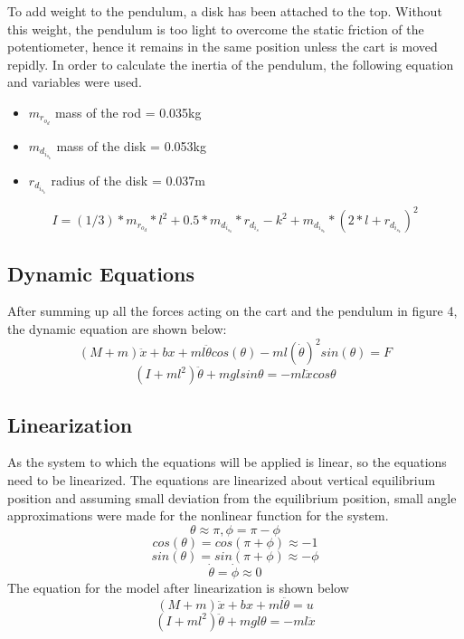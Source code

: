 \documentclass[12pt]{article}
\begin{document}
To add weight to the pendulum, a disk has been attached to the top. Without this weight, the pendulum is too light to overcome the static friction of the potentiometer, hence it remains in the same position unless the cart is moved repidly. In order to calculate the inertia of the pendulum, the following equation and variables were used.
\begin{itemize}
    \item $m_r_o_d$ mass of the rod = 0.035kg
    \item $m_d_i_s_k$ mass of the disk = 0.053kg 
    \item $r_d_i_s_k$ radius of the disk = 0.037m
\end{itemize}
\begin{equation}
   I = (1/3)*m_r_o_d*l^2 + 0.5*m_d_i_s_k*r_d_i_s-k^2 + m_d_i_s_k*(2*l + r_d_i_s_k)^2
\end{equation}


\subsection{Dynamic Equations}
After summing up all the forces acting on the cart and the pendulum in figure 4, the dynamic equation are shown below:
\begin{equation}
    (M+m)\ddot{x} + bx +ml\ddot{\theta}cos(\theta) - ml(\dot{\theta})^2sin(\theta) = F 
\end{equation}
\begin{equation}
    (I+ml^2)\ddot{\theta} + mglsin\theta = -ml\ddot{x}cos\theta
\end{equation}
\subsection{Linearization}
As the system to which the equations will be applied is linear, so the equations need to be linearized. The equations are linearized about vertical equilibrium position and assuming small deviation from the equilibrium position, small angle approximations were made for the nonlinear function for the system. 
\begin{equation}
    \theta{\approx}\pi, \phi = \pi - \phi
\end{equation}
\begin{equation}
    cos(\theta) = cos(\pi + \phi){\approx} -1
\end{equation}
\begin{equation}
    sin(\theta) = sin(\pi + \phi){\approx} -\phi
\end{equation}
\begin{equation}
    \dot{\theta} = \dot{\phi}{\approx} 0
\end{equation}
The equation for the model after linearization is shown below
\begin{equation}
    (M+m)\ddot{x} + bx +ml\ddot{\theta} = u
\end{equation}
\begin{equation}
    (I+ml^2)\ddot{\theta} + mgl\theta = -ml\ddot{x}
\end{equation}
\end{document}
